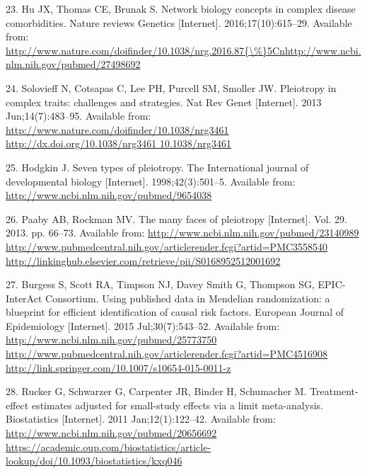 \documentclass[]{article}
\begin{document}
\hypertarget{ref-Hu2016}{}
23. Hu JX, Thomas CE, Brunak S. Network biology concepts in complex
disease comorbidities. Nature reviews Genetics {[}Internet{]}.
2016;17(10):615--29. Available from:
\href{http://www.nature.com/doifinder/10.1038/nrg.2016.87\%7B/\%\%7D5Cnhttp://www.ncbi.nlm.nih.gov/pubmed/27498692}{http://www.nature.com/doifinder/10.1038/nrg.2016.87\{\textbackslash{}\%\}5Cnhttp://www.ncbi.nlm.nih.gov/pubmed/27498692}

\hypertarget{ref-Solovieff2013}{}
24. Solovieff N, Cotsapas C, Lee PH, Purcell SM, Smoller JW. Pleiotropy
in complex traits: challenges and strategies. Nat Rev Genet
{[}Internet{]}. 2013 Jun;14(7):483--95. Available from:
\href{http://www.nature.com/doifinder/10.1038/nrg3461\%20http://dx.doi.org/10.1038/nrg3461\%2010.1038/nrg3461}{http://www.nature.com/doifinder/10.1038/nrg3461 http://dx.doi.org/10.1038/nrg3461 10.1038/nrg3461}

\hypertarget{ref-Hodgkin1998}{}
25. Hodgkin J. Seven types of pleiotropy. The International journal of
developmental biology {[}Internet{]}. 1998;42(3):501--5. Available from:
\url{http://www.ncbi.nlm.nih.gov/pubmed/9654038}

\hypertarget{ref-Paaby2013}{}
26. Paaby AB, Rockman MV. The many faces of pleiotropy {[}Internet{]}.
Vol. 29. 2013. pp. 66--73. Available from:
\href{http://www.ncbi.nlm.nih.gov/pubmed/23140989\%20http://www.pubmedcentral.nih.gov/articlerender.fcgi?artid=PMC3558540\%20http://linkinghub.elsevier.com/retrieve/pii/S0168952512001692}{http://www.ncbi.nlm.nih.gov/pubmed/23140989 http://www.pubmedcentral.nih.gov/articlerender.fcgi?artid=PMC3558540 http://linkinghub.elsevier.com/retrieve/pii/S0168952512001692}

\hypertarget{ref-Burgess2015b}{}
27. Burgess S, Scott RA, Timpson NJ, Davey Smith G, Thompson SG, EPIC-
InterAct Consortium. Using published data in Mendelian randomization: a
blueprint for efficient identification of causal risk factors. European
Journal of Epidemiology {[}Internet{]}. 2015 Jul;30(7):543--52.
Available from:
\href{http://www.ncbi.nlm.nih.gov/pubmed/25773750\%20http://www.pubmedcentral.nih.gov/articlerender.fcgi?artid=PMC4516908\%20http://link.springer.com/10.1007/s10654-015-0011-z}{http://www.ncbi.nlm.nih.gov/pubmed/25773750 http://www.pubmedcentral.nih.gov/articlerender.fcgi?artid=PMC4516908 http://link.springer.com/10.1007/s10654-015-0011-z}

\hypertarget{ref-Rucker2011}{}
28. Rucker G, Schwarzer G, Carpenter JR, Binder H, Schumacher M.
Treatment-effect estimates adjusted for small-study effects via a limit
meta-analysis. Biostatistics {[}Internet{]}. 2011 Jan;12(1):122--42.
Available from:
\href{http://www.ncbi.nlm.nih.gov/pubmed/20656692\%20https://academic.oup.com/biostatistics/article-lookup/doi/10.1093/biostatistics/kxq046}{http://www.ncbi.nlm.nih.gov/pubmed/20656692 https://academic.oup.com/biostatistics/article-lookup/doi/10.1093/biostatistics/kxq046}
\end{document}
